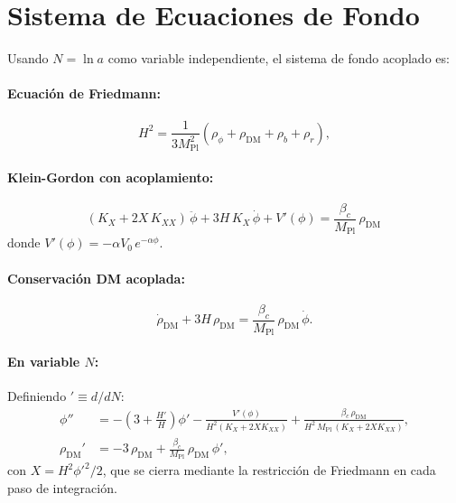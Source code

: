 \documentclass[11pt,a4paper]{article}
\newcommand{\Mpl}{M_{\mathrm{Pl}}}
\newcommand{\brac}[1]{\left(#1\right)}
\begin{document}
\section{Sistema de Ecuaciones de Fondo}
\label{sec:background}

Usando $N = \ln a$ como variable independiente, el sistema de fondo
acoplado es:

\paragraph{Ecuación de Friedmann:}
\begin{equation}
  H^2 = \frac{1}{3\Mpl^2}
        \brac{\rho_\phi + \rho_{\mathrm{DM}} + \rho_b + \rho_r},
  \label{eq:Friedmann}
\end{equation}

\paragraph{Klein-Gordon con acoplamiento:}
\begin{equation}
  \brac{K_X + 2X\,K_{XX}}\,\ddot\phi
  + 3H\,K_X\,\dot\phi
  + V'(\phi)
  = \frac{\beta_c}{\Mpl}\,\rho_{\mathrm{DM}}\,
  \label{eq:KG}
\end{equation}
donde $V'(\phi) = -\alpha V_0\,e^{-\alpha\phi}$.

\paragraph{Conservación DM acoplada:}
\begin{equation}
  \dot\rho_{\mathrm{DM}} + 3H\,\rho_{\mathrm{DM}}
  = \frac{\beta_c}{\Mpl}\,\rho_{\mathrm{DM}}\,\dot\phi.
  \label{eq:rhoDM}
\end{equation}

\paragraph{En variable $N$:}
Definiendo $'\equiv d/dN$:
\begin{align}
  \phi''  &= -\brac{3 + \frac{H'}{H}}\phi'
             - \frac{V'(\phi)}{H^2(K_X + 2XK_{XX})}
             + \frac{\beta_c\,\rho_{\mathrm{DM}}}{H^2\,\Mpl\,(K_X + 2XK_{XX})},
  \label{eq:phi_N}\\[4pt]
  \rho_{\mathrm{DM}}' &= -3\,\rho_{\mathrm{DM}}
                          + \frac{\beta_c}{\Mpl}\,\rho_{\mathrm{DM}}\,\phi',
  \label{eq:rho_N}
\end{align}
con $X = H^2{\phi'}^2/2$, que se cierra mediante la restricción de
Friedmann en cada paso de integración.
\end{document}
